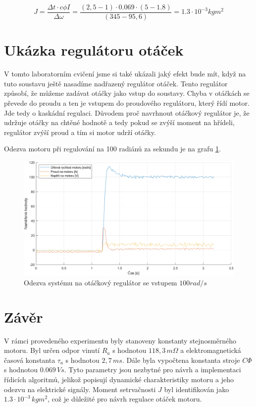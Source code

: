 \documentclass{protokol}
\begin{document}
\begin{equation}
    J = \frac{\Delta{t}\cdot{}c\phi{}I}{\Delta{\omega}} = \frac{(2,5 - 1)\cdot{}0.069\cdot{}(5-1.8)}{(345 - 95,6)} = 1.3\cdot{}10^{-3}kgm^2
    \label{eq:VypocetMomentSetrvacnostiMotoru}
\end{equation}

\section{Ukázka regulátoru otáček}

V tomto laboratorním cvičení jsme si také ukázali jaký efekt bude mít, když na tuto soustavu ještě nasadíme nadřazený regulátor otáček. Tento regulátor způsobí, že můžeme zadávat otáčky jako vstup do soustavy. Chyba v otáčkách se převede do proudu a ten je vstupem do proudového regulátoru, který řídí motor. Jde tedy o kaskádní regulaci. Důvodem proč navrhnout otáčkový regulátor je, že udržuje otáčky na chtěné hodnotě a tedy pokud se zvýší moment na hřídeli, regulátor zvýší proud a tím si motor udrží otáčky.

Odezva motoru při regulování na 100 radiánů za sekundu je na grafu \ref{fig:OdezvaNaOtackovyRegulator}.

\begin{figure}[H]
    \centering
    \includegraphics[width=1\linewidth]{OdezvaNaOtackovyRegulator.png}
    \caption{Odezva systému na otáčkový regulátor se vstupem $100 rad/s$}
    \label{fig:OdezvaNaOtackovyRegulator}
\end{figure}

\section{Závěr}

V rámci provedeného experimentu byly stanoveny konstanty stejnosměrného motoru. Byl určen odpor vinutí $R_a$ s hodnotou $118,3 \, m\Omega$ a elektromagnetická časová konstanta $\tau_a$ s hodnotou $2,7 \, ms$. Dále byla vypočtena konstanta stroje $C\Phi{}$ s hodnotou $0.069 \, Vs$. Tyto parametry jsou nezbytné pro návrh a implementaci řídicích algoritmů, jelikož popisují dynamické charakteristiky motoru a jeho odezvu na elektrické signály. Moment setrvačnosti $J$ byl identifikován jako $1.3 \cdot 10^{-3} \, kgm^2$, což je důležité pro návrh regulace otáček motoru.
\end{document}
